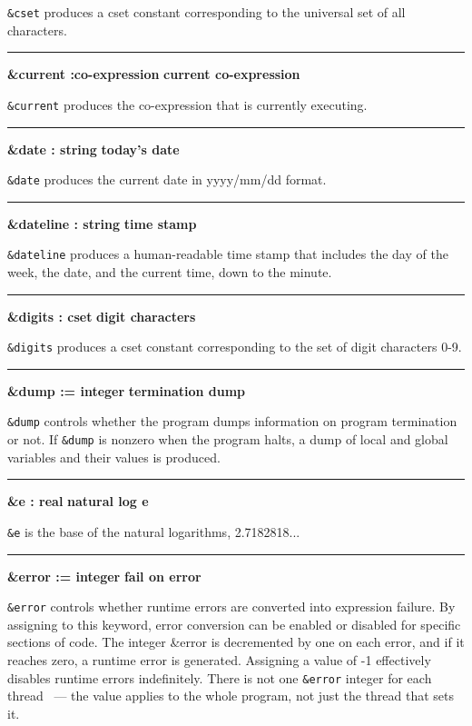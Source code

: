 \noindent
{}\texttt{\&cset} produces a cset constant
corresponding to the universal set of all characters.

\bigskip\hrule\vspace{0.1cm}
\noindent
{\bf \&current :co{}-expression } \hfill {\bf current co{}-expression}

\noindent
{}\texttt{\&current} produces the
co-expression that is currently executing.

\bigskip\hrule\vspace{0.1cm}
\noindent
{\bf \&date : string } \hfill {\bf today's date}

\noindent
{}\texttt{\&date} produces the current
date in yyyy/mm/dd format.

\bigskip\hrule\vspace{0.1cm}
\noindent
{\bf \&dateline : string } \hfill {\bf time stamp}

\noindent
{}\texttt{\&dateline} produces a human-readable time
stamp that includes the day of the week, the date, and the current
time, down to the minute.

\bigskip\hrule\vspace{0.1cm}
\noindent
{\bf \&digits : cset } \hfill {\bf digit characters}

\noindent
{}\texttt{\&digits} produces a cset constant
corresponding to the set of digit characters 0-9.

\bigskip\hrule\vspace{0.1cm}
\noindent
{\bf \&dump := integer } \hfill {\bf termination dump}

\noindent
\texttt{\&dump} controls whether the program dumps information on
program termination or not. If \texttt{\&dump} is nonzero when the
program halts, a dump of local and global variables and their values is
produced.

\bigskip\hrule\vspace{0.1cm}
\noindent
{\bf \&e : real } \hfill {\bf natural log e}

\noindent
{}\texttt{\&e} is the base of the natural
logarithms, 2.7182818...

\bigskip\hrule\vspace{0.1cm}
\noindent
{\bf \&error := integer } \hfill {\bf fail on error}

\noindent
{}\texttt{\&error} controls whether
runtime errors are converted into expression failure. By assigning to
this keyword, error conversion can be enabled or disabled for specific
sections of code. The integer \&error is decremented by one on each
error, and if it reaches zero, a runtime error is generated. Assigning
a value of -1 effectively disables runtime errors indefinitely. 
There is not one \texttt{\&error} integer for each thread \ConcurrencyIssue\
--- the value applies to the whole program, not just the thread that sets it.

